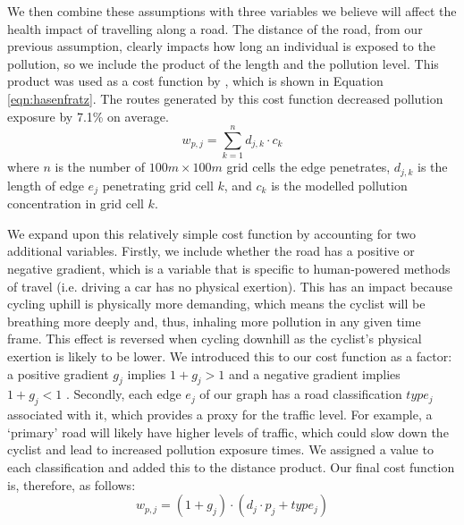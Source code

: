 \documentclass[11pt]{report}
\begin{document}
We then combine these assumptions with three variables we believe will affect the health impact of travelling along a road. The distance of the road, from our previous assumption, clearly impacts how long an individual is exposed to the pollution, so we include the product of the length and the pollution level. This product was used as a cost function by \cite{Hasenfratz2015highresmapsTram}, which is shown in Equation \ref{eqn:hasenfratz}. The routes generated by this cost function decreased pollution exposure by 7.1\% on average.
\begin{equation} \label{eqn:hasenfratz}
w_{p, j} = \sum_{k=1}^{n} d_{j, k} \cdot c_k
\end{equation}
where $n$ is the number of $100m \times 100m$ grid cells the edge penetrates, $d_{j, k}$ is the length of edge $e_j$ penetrating grid cell $k$, and $c_k$ is the modelled pollution concentration in grid cell $k$.

We expand upon this relatively simple cost function by accounting for two additional variables. Firstly, we include whether the road has a positive or negative gradient, which is a variable that is specific to human-powered methods of travel (i.e. driving a car has no physical exertion). This has an impact because cycling uphill is physically more demanding, which means the cyclist will be breathing more deeply and, thus, inhaling more pollution in any given time frame. This effect is reversed when cycling downhill as the cyclist's physical exertion is likely to be lower. We introduced this to our cost function as a factor: a positive gradient $g_j$ implies $1 + g_j > 1$ and a negative gradient implies $1 + g_j < 1$ . Secondly, each edge $e_j$ of our graph has a road classification $type_j$ associated with it, which provides a proxy for the traffic level. For example, a `primary' road will likely have higher levels of traffic, which could slow down the cyclist and lead to increased pollution exposure times. We assigned a value to each classification and added this to the distance product. Our final cost function is, therefore, as follows:
\begin{equation}
w_{p, j} = (1 + g_j) \cdot (d_j \cdot p_j + type_j)
\end{equation}

\end{document}
